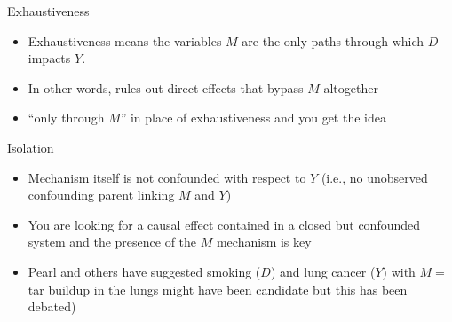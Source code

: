 \documentclass{beamer}
\begin{document}
\begin{frame}{Exhaustiveness}

  \begin{center}
  \end{center}


  \begin{itemize}
    \item Exhaustiveness means the variables $M$ are the only paths through which $D$ impacts $Y$.
    \item In other words, rules out direct effects that bypass $M$ altogether
    \item ``only through $M$'' in place of exhaustiveness and you get the idea
  \end{itemize}

\end{frame}

\begin{frame}{Isolation}

  \begin{center}
  \end{center}


  \begin{itemize}
    \item Mechanism itself is not confounded with respect to $Y$ (i.e., no unobserved confounding parent linking $M$ and $Y$)
    \item You are looking for a causal effect contained in a closed but confounded system and the presence of the $M$ mechanism is key
    \item Pearl and others have suggested smoking ($D$) and lung cancer ($Y$) with $M=$ tar buildup in the lungs might have been candidate but this has been debated)
  \end{itemize}

\end{frame}
\end{document}
